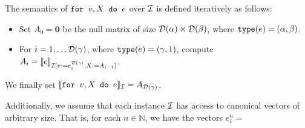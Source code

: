 The semantics of $\texttt{for }v,X \texttt{ do }e$ over $\mathcal{I}$ is defined iteratively as follows:
\begin{itemize}
\item Set $A_0 = \mathbf{0}$ be the null matrix of size $\mathcal{D}(\alpha)\times \mathcal{D}(\beta)$, where $\texttt{type}(e) = (\alpha,\beta)$.
\item For $i=1,\ldots \mathcal{D}(\gamma)$, where $\texttt{type}(e)= (\gamma,1)$, compute $A_i = \llbracket e \rrbracket_{\mathcal{I}[v := e^{\mathcal{D}(\gamma)}_i, X:= A_{i-1}]}$.
\end{itemize}
We finally set $\llbracket \texttt{for }v,X \texttt{ do }e \rrbracket_{\mathcal{I}} = A_{\mathcal{D}(\gamma)}$.

Additionally, we assume that each instance $\mathcal{I}$ has access to canonical vectors of arbitrary size. That is, for each $n\in \mathbb{N}$, we have the vectors $e^n_1 = $